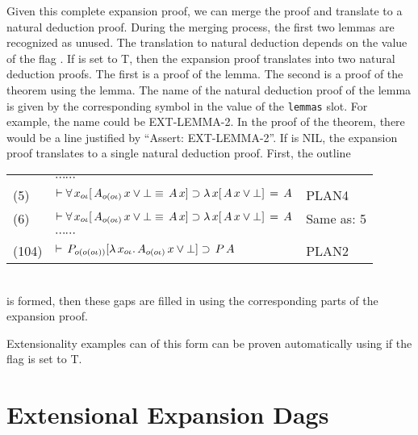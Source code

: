 Given this complete expansion proof, we can merge the proof
and translate to a natural deduction proof.  During the merging
process, the first two lemmas are recognized as unused.
The translation to natural deduction depends on the value of the flag
.  If 
is set to T, then the expansion proof translates into two natural deduction
proofs.  The first is a proof of the lemma.  The second is a proof
of the theorem using the lemma.  The name of the natural deduction proof
of the lemma is given by the corresponding symbol in the value of
the \verb+lemmas+ slot.  For example, the name could be EXT-LEMMA-2.
In the proof of the theorem, there would be a line justified by
``Assert: EXT-LEMMA-2''.  If  is NIL,
the expansion proof translates to a single natural deduction proof.
First, the outline \\
\begin{tabular}{lll}
 & $\cdots\cdots$ & \\
(5) & $\vdash \forall \,x_{o\iota} [ \,A_{o(o\iota)} \,x \lor \bot \equiv \,A \,x ] \supset \lambda \,x [ \,A \,x \lor \bot ] \,= \,A$ & PLAN4 \\
(6) & $\vdash \forall \,x_{o\iota} [ \,A_{o(o\iota)} \,x \lor \bot \equiv \,A \,x ] \supset \lambda \,x [ \,A \,x \lor \bot ] \,= \,A$  & Same as: 5 \\
 & $\cdots\cdots$ & \\
(104) & $\vdash \,P_{o(o(o\iota))} [ \lambda \,x_{o\iota} . \,A_{o(o\iota)} \,x \lor \bot ] \supset \,P \,A$ & PLAN2
\end{tabular} \\
is formed, then these gaps are filled in using the corresponding
parts of the expansion proof.

Extensionality examples can of this form can be proven
automatically using  if the flag 
is set to T.


\section{Extensional Expansion Dags}\label{sect:edags}

